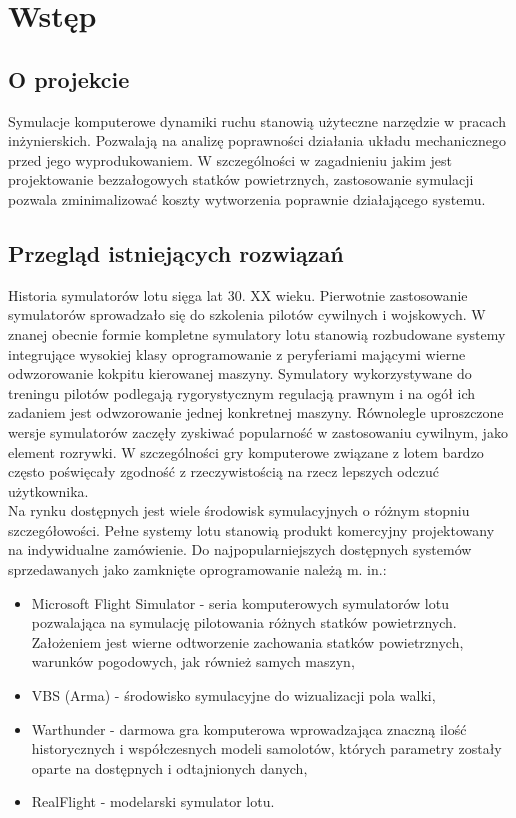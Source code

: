 \documentclass[15pt]{sprawozdanie}
\begin{document}
\newpage

\section{Wstęp}

\subsection{O projekcie}

Symulacje komputerowe dynamiki ruchu stanowią użyteczne narzędzie w pracach inżynierskich. Pozwalają na analizę poprawności działania układu mechanicznego przed jego wyprodukowaniem. W szczególności w zagadnieniu jakim jest projektowanie bezzałogowych statków powietrznych, zastosowanie symulacji pozwala zminimalizować koszty wytworzenia poprawnie działającego systemu.

\subsection{Przegląd istniejących rozwiązań}

Historia symulatorów lotu sięga lat 30. XX wieku. Pierwotnie zastosowanie symulatorów sprowadzało się do szkolenia pilotów cywilnych i wojskowych. W znanej obecnie formie kompletne symulatory lotu stanowią rozbudowane systemy integrujące wysokiej klasy oprogramowanie z peryferiami mającymi wierne odwzorowanie kokpitu kierowanej maszyny. Symulatory wykorzystywane do treningu pilotów podlegają rygorystycznym regulacją prawnym i na ogół ich zadaniem jest odwzorowanie jednej konkretnej maszyny. Równolegle uproszczone wersje symulatorów zaczęły zyskiwać popularność w zastosowaniu cywilnym, jako element rozrywki. W szczególności gry komputerowe związane z lotem bardzo często poświęcały zgodność z rzeczywistością na rzecz lepszych odczuć użytkownika.\\

Na rynku dostępnych jest wiele środowisk symulacyjnych o różnym stopniu szczegółowości. Pełne systemy lotu stanowią produkt komercyjny projektowany na indywidualne zamówienie. Do najpopularniejszych dostępnych systemów sprzedawanych jako zamknięte oprogramowanie należą m. in.:

\begin{itemize}
\item Microsoft Flight Simulator -  seria komputerowych symulatorów lotu pozwalająca na symulację pilotowania różnych statków powietrznych. Założeniem jest wierne odtworzenie zachowania statków powietrznych, warunków pogodowych, jak również samych maszyn,
\item VBS (Arma) - środowisko symulacyjne do wizualizacji pola walki,
\item Warthunder - darmowa gra komputerowa wprowadzająca znaczną ilość historycznych i współczesnych modeli samolotów, których parametry zostały oparte na dostępnych i odtajnionych danych,
\item RealFlight - modelarski symulator lotu.
\end{itemize}
\end{document}
